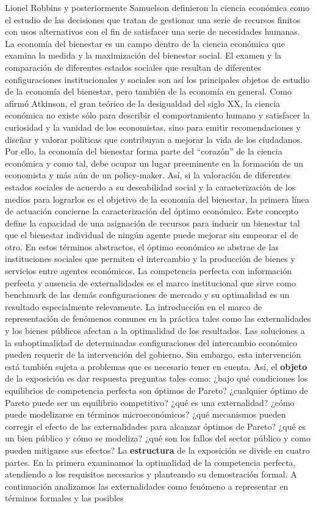 \documentclass{nuevotema}
\begin{document}
\ideaclave

Lionel Robbins y posteriormente Samuelson definieron la ciencia económica como el estudio de las decisiones que tratan de gestionar una serie de recursos finitos con usos alternativos con el fin de satisfacer una serie de necesidades humanas. La economía del bienestar es un campo dentro de la ciencia económica que examina la medida y la maximización del bienestar social. El examen y la comparación de diferentes estados sociales que resultan de diferentes configuraciones institucionales y sociales son así los principales objetos de estudio de la economía del bienestar, pero también de la economía en general. Como afirmó Atkinson, el gran teórico de la desigualdad del siglo XX, la ciencia económica no existe sólo para describir el comportamiento humano y satisfacer la curiosidad y la vanidad de los economistas, sino para emitir recomendaciones y diseñar y valorar políticas que contribuyan a mejorar la vida de los ciudadanos. Por ello, la economía del bienestar forma parte del ``corazón'' de la ciencia económica y como tal, debe ocupar un lugar preeminente en la formación de un economista y más aún de un policy-maker. Así, si la valoración de diferentes estados sociales de acuerdo a su deseabilidad social y la caracterización de los medios para lograrlos es el objetivo de la economía del bienestar, la primera línea de actuación concierne la caracterización del óptimo económico. Este concepto define la capacidad de una asignación de recursos para inducir un bienestar tal que el bienestar individual de ningún agente puede mejorar sin empeorar el de otro. En estos términos abstractos, el óptimo económico se abstrae de las instituciones sociales que permiten el intercambio y la producción de bienes y servicios entre agentes económicos. La competencia perfecta con información perfecta y ausencia de externalidades es el marco institucional que sirve como benchmark de las demás configuraciones de mercado y su optimalidad es un resultado especialmente relevamente. La introducción en el marco de representación de fenómenos comunes en la práctica tales como las externalidades y los bienes públicos afectan a la optimalidad de los resultados. Las soluciones a la suboptimalidad de determinadas configuraciones del intercambio económico pueden requerir de la intervención del gobierno. Sin embargo, esta intervención está también sujeta a problemas que es necesario tener en cuenta. Así, el \textbf{objeto} de la exposición es dar respuesta preguntas tales como: ¿bajo qué condiciones los equilibrios de competencia perfecta son óptimos de Pareto? ¿cualquier óptimo de Pareto puede ser un equilibrio competitivo? ¿qué es una externalidad? ¿cómo puede modelizarse en términos microeconómicos? ¿qué mecanismos pueden corregir el efecto de las externalidades para alcanzar óptimos de Pareto? ¿qué es un bien público y cómo se modeliza? ¿qué son los fallos del sector público y como pueden mitigarse sus efectos? La \textbf{estructura} de la exposición se divide en cuatro partes. En la primera examinamos la optimalidad de la competencia perfecta, atendiendo a los requisitos necesarios y planteando su demostración formal. A continuación analizamos las externalidades como fenómeno a representar en términos formales y las posibles 
\end{document}
